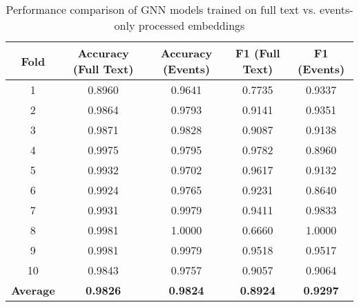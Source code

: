 \begin{table}[ht]
    \centering
    \begin{tabular}{|c|c|c|c|c|}
    \hline
    \textbf{Fold} & \textbf{Accuracy (Full Text)} & \textbf{Accuracy (Events)} & \textbf{F1 (Full Text)} & \textbf{F1 (Events)} \\
    \hline
    1 & 0.8960 & 0.9641 & 0.7735 & 0.9337 \\
    2 & 0.9864 & 0.9793 & 0.9141 & 0.9351 \\
    3 & 0.9871 & 0.9828 & 0.9087 & 0.9138 \\
    4 & 0.9975 & 0.9795 & 0.9782 & 0.8960 \\
    5 & 0.9932 & 0.9702 & 0.9617 & 0.9132 \\
    6 & 0.9924 & 0.9765 & 0.9231 & 0.8640 \\
    7 & 0.9931 & 0.9979 & 0.9411 & 0.9833 \\
    8 & 0.9981 & 1.0000 & 0.6660 & 1.0000 \\
    9 & 0.9981 & 0.9979 & 0.9518 & 0.9517 \\
    10 & 0.9843 & 0.9757 & 0.9057 & 0.9064 \\
    \hline
    \textbf{Average} & \textbf{0.9826} & \textbf{0.9824} & \textbf{0.8924} & \textbf{0.9297} \\
    \hline
    \end{tabular}
    \caption{Performance comparison of GNN models trained on full text vs. events-only processed embeddings}
    \label{tab:gnn_comparison}
    \end{table}
    